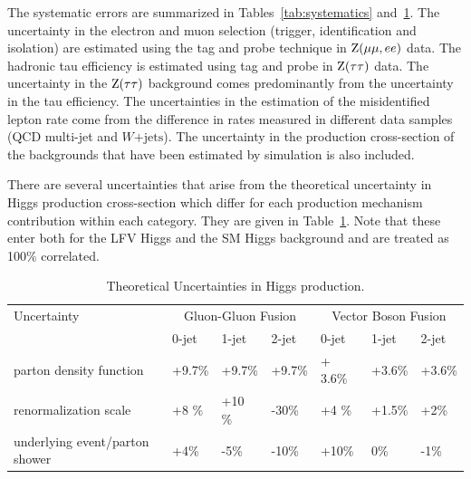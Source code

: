 \documentclass[oneside, letterpaper, oldfontcommands]{memoir}
\begin{document}
{{{\begin{table}[t]
\end{table}


The systematic errors are summarized in Tables~\ref{tab:systematics} and~\ref{tab:theory_systematics}. The
uncertainty in the electron and muon selection (trigger, identification and isolation) are estimated using
the tag and probe technique in $\mathrm{Z}(\mu\mu,ee)$ data. The hadronic tau efficiency is estimated using tag and probe
in $\mathrm{Z}(\tau \tau)$ data.
The uncertainty in the
$\mathrm{Z}(\tau\tau)$ background comes predominantly from the uncertainty in the tau efficiency.
The uncertainties in the estimation of the misidentified lepton  rate come from the
difference in rates measured in different data samples (QCD multi-jet and $W\mathrm{+jets}$).
The uncertainty in the production
cross-section of the backgrounds that have been  estimated by simulation is also
included.

There are several uncertainties that arise from the theoretical uncertainty in Higgs production cross-section
which differ for each production mechanism contribution within each category. They are given in Table~\ref{tab:theory_systematics}.
Note that these enter both for the LFV Higgs and the SM Higgs background and are treated as 100\% correlated.


\begin{table}[hbtp]
 \begin{center}
  \caption{Theoretical Uncertainties in Higgs production.}
  \label{tab:theory_systematics}
  \vspace{0.1in}
  \begin{tabular}{|l|l|l|l|l|l|l|} \hline
Uncertainty                  &  \multicolumn{3}{c|}{Gluon-Gluon Fusion} &  \multicolumn{3}{c|}{Vector Boson Fusion}  \\ \cline{2-7}
                                &    0-jet  & 1-jet  & 2-jet   & 0-jet & 1-jet  & 2-jet  \\ \hline
parton density function         &    +9.7\%  &  +9.7\% &   +9.7\% & + 3.6\%  &   +3.6\%  &  +3.6\%  \\ \hline
renormalization scale           &    +8 \%   & +10 \%  &  -30\%   & +4 \%    &   +1.5\%  & +2\%   \\ \hline
underlying event/parton shower  &   +4\%     & -5\%   &  -10\%   & +10\%    &   0\%    & -1\%   \\ \hline
  \end{tabular}
 \end{center}
\end{table}
~                

}}}
\end{document}
